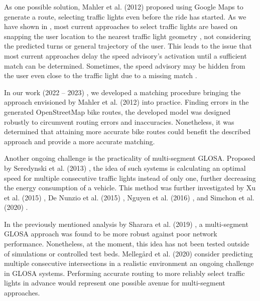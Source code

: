As one possible solution, Mahler et al. (2012) \cite{mahler_reducing_2012} proposed using Google Maps to generate a route, selecting traffic lights even before the ride has started. As we have shown in , most current approaches to select traffic lights are based on snapping the user location to the nearest traffic light geometry \cite{katsaros_performance_2011, bernais_design_2016, wilson_driver_2017, stahlmann_exploring_2018, bhattacharyya_assessing_2022}, not considering the predicted turns or general trajectory of the user. This leads to the issue that most current approaches delay the speed advisory's activation until a sufficient match can be determined. Sometimes, the speed advisory may be hidden from the user even close to the traffic light due to a missing match \cite{wilson_driver_2017, stahlmann_exploring_2018}.

In our work (2022 -- 2023) \cite{matthes2022matching, matthes2023geo}, we developed a matching procedure bringing the approach envisioned by Mahler et al. (2012) \cite{mahler_reducing_2012} into practice. Finding errors in the generated OpenStreetMap bike routes, the developed model was designed robustly to circumvent routing errors and inaccuracies. Nonetheless, it was determined that attaining more accurate bike routes could benefit the described approach and provide a more accurate matching.

Another ongoing challenge is the practicality of multi-segment GLOSA. Proposed by Seredynski et al. (2013) \cite{seredynski_comparison_2013, seredynski_multi-segment_2013}, the idea of such systems is calculating an optimal speed for multiple consecutive traffic lights instead of only one, further decreasing the energy consumption of a vehicle. This method was further investigated by Xu et al. (2015) \cite{xu_bb_2015}, De Nunzio et al. (2015) \cite{de_nunzio_eco-driving_2015}, Nguyen et al. (2016) \cite{nguyen_efficient_2016}, and Simchon et al. (2020) \cite{simchon_real-time_2020}. 

In the previously mentioned analysis by Sharara et al. (2019) \cite{sharara_impact_2019}, a multi-segment GLOSA approach was found to be more robust against poor network performance. Nonetheless, at the moment, this idea has not been tested outside of simulations or controlled test beds. Mellegård et al. (2020) \cite{mellegard_day_2020} consider predicting multiple consecutive intersections in a realistic environment an ongoing challenge in GLOSA systems. Performing accurate routing to more reliably select traffic lights in advance would represent one possible avenue for multi-segment approaches.

